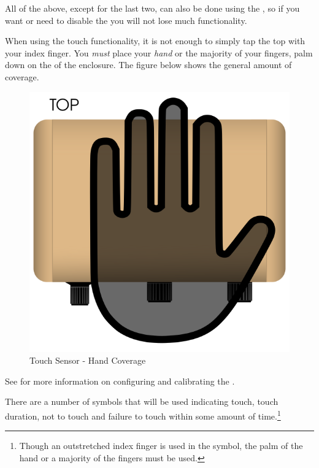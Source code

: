 All of the above, except for the last two, can also be done using the ,
so if you want or need to disable the  you will not lose much
functionality.

\par\medskip

When using the touch functionality, it is not enough to simply tap the top
with your index finger.  You \textit{must} place your \textit{hand} or the
majority of your fingers, palm down on the  of the enclosure.
The figure below shows the general amount of coverage.

\begin{figure}[H]
\centering
  \includegraphics{images/touch_hand_coverage.png}
\caption{Touch Sensor - Hand Coverage} \label{fig:Hand Coverage}
\end{figure}

See \hyperref[Touch Settings]{} for more information on configuring and
calibrating the .

\par\medskip

There are a number of symbols that will be used indicating touch, touch
duration, not to touch and failure to touch within some amount of
time.\footnote{ Though an outstretched index finger is used in the symbol, the
palm of the hand or a majority of the fingers must be used.}

